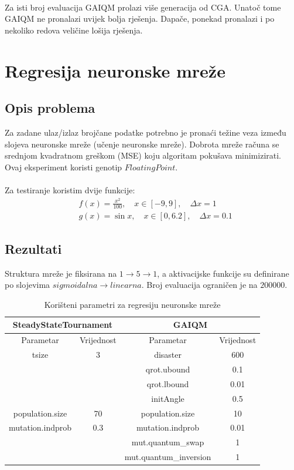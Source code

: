 \documentclass[times, utf8, zavrsni, numeric]{fer}
\begin{document}
\paragraph{}
Za isti broj evaluacija GAIQM prolazi više generacija od CGA. Unatoč tome GAIQM ne pronalazi uvijek bolja rješenja. Dapače, ponekad pronalazi i po nekoliko redova veličine lošija rješenja.

\section{Regresija neuronske mreže}
\subsection{Opis problema}
Za zadane ulaz/izlaz brojčane podatke potrebno je pronaći težine veza između slojeva neuronske mreže (učenje neuronske mreže). Dobrota mreže računa se srednjom kvadratnom greškom (MSE) koju algoritam pokušava minimizirati. Ovaj eksperiment koristi genotip $FloatingPoint$.

\paragraph{}
Za testiranje koristim dvije funkcije:
\begin{align*}
&f(x) = \frac{x^2}{100},\quad x \in [-9, 9], \quad \Delta x = 1 \\
&g(x) = \sin{x},\quad x \in [0, 6.2], \quad \Delta x = 0.1
\end{align*}

\newpage

\subsection{Rezultati}
Struktura mreže je fiksirana na $1\to 5\to 1$, a aktivacijske funkcije su definirane po slojevima $sigmoidalna \to linearna$.
Broj evaluacija ograničen je na $200000$.

\begin{table}[htb]
\caption{Korišteni parametri za regresiju neuronske mreže}
\centering
\begin{tabular}{|c|c||c|c|} \hline
\multicolumn{2}{|c||}{SteadyStateTournament} & \multicolumn{2}{c|}{GAIQM} \\ 
\hline
Parametar & Vrijednost & Parametar & Vrijednost \\ 
\hline
tsize & 3 & disaster & 600 \\
&& qrot.ubound & 0.1 \\
&& qrot.lbound & 0.01 \\
&& initAngle & 0.5 \\
population.size & 70 & population.size & 10 \\
mutation.indprob & 0.3 & mutation.indprob & 0.01 \\
&& mut.quantum\_swap & 1 \\
&& mut.quantum\_inversion & 1 \\
\hline
\end{tabular}
\end{table}
\end{document}
